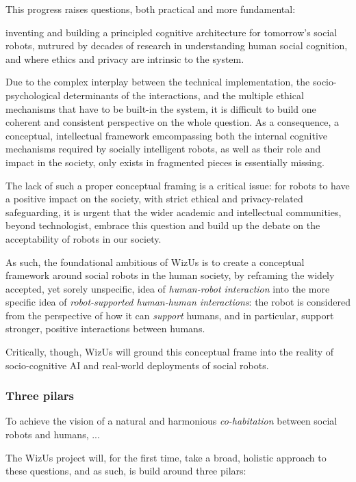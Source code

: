 \documentclass[]{article}
\newcommand{\project}{WizUs\xspace}
\begin{document}
This progress raises questions, both practical and more fundamental:

inventing and building a principled cognitive architecture for tomorrow's social
robots, nutrured by decades of research in understanding human social cognition,
and where ethics and privacy are intrinsic to the system.

Due to the complex interplay between the technical implementation, the
socio-psychological determinants of the interactions, and the multiple ethical
mechanisms that have to be built-in the system, it is difficult to build one
coherent and consistent perspective on the whole question. As a consequence, a
conceptual, intellectual framework emcompassing both the internal cognitive
mechanisms required by socially intelligent robots, as well as their role and
impact in the society, only exists in fragmented pieces  is essentially missing.

The lack of such a proper conceptual framing is a critical issue: for robots to
have a positive impact on the society, with strict ethical and privacy-related
safeguarding, it is urgent that the wider academic and intellectual communities,
beyond technologist, embrace this question and build up the debate on the
acceptability of robots in our society.

As such, the foundational ambitious of \project is to create a conceptual
framework around social robots in the human society, by reframing the widely
accepted, yet sorely unspecific, idea of \emph{human-robot interaction} into the
more specific idea of \emph{robot-supported human-human interactions}: the robot
is considered from the perspective of how it can \emph{support} humans, and in
particular, support stronger, positive interactions between humans.

Critically, though, \project will ground this conceptual frame into the reality
of socio-cognitive AI and real-world deployments of social robots.


\subsubsection{Three pilars}

To achieve the vision of a natural and harmonious \emph{co-habitation} between
social robots and humans, ...

The \project project will, for the first time, take a broad, holistic approach
to these questions, and as such, is build around three pilars:
\end{document}
